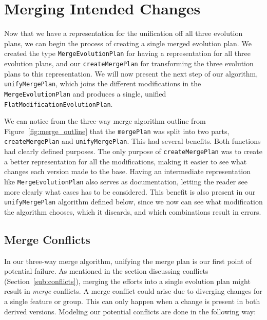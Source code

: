 \documentclass[a4paper,english]{ifimaster}
\begin{document}
\section{Merging Intended Changes}%
\label{sec:merging_intended_changes}

Now that we have a representation for the unification off all three evolution plans, we can begin the process of creating a single merged evolution plan. We created the type \texttt{Merge\-Evolution\-Plan} for having a representation for all three evolution plans, and our \texttt{create\-Merge\-Plan} for transforming the three evolution plans to this representation. We will now present the next step of our algorithm, \texttt{unify\-Merge\-Plan}, which joins the different modifications in the \texttt{Merge\-Evolution\-Plan} and produces a single, unified \texttt{Flat\-Modification\-Evolution\-Plan}.

We can notice from the three-way merge algorithm outline from Figure~\vref{fig:merge_outline} that the \texttt{mergePlan} was split into two parts, \texttt{create\-Merge\-Plan} and \texttt{unify\-Merge\-Plan}. This had several benefits. Both functions had clearly defined purposes. The only purpose of \texttt{create\-Merge\-Plan} was to create a better representation for all the modifications, making it easier to see what changes each version made to the base. Having an intermediate representation like \texttt{Merge\-Evolution\-Plan} also serves as documentation, letting the reader see more clearly what cases has to be considered. This benefit is also present in our \texttt{unify\-Merge\-Plan} algorithm defined below, since we now can see what modification the algorithm chooses, which it discards, and which combinations result in errors.

\subsection{Merge Conflicts}%
\label{sub:merge_errors}

In our three-way merge algorithm, unifying the merge plan is our first point of potential failure. As mentioned in the section discussing conflicts (Section~\vref{sub:conflicts}), merging the efforts into a single evolution plan might result in \textit{merge} conflicts. A merge conflict could arise due to diverging changes for a single feature or group. This can only happen when a change is present in both derived versions. Modeling our potential conflicts are done in the following way:
\end{document}
